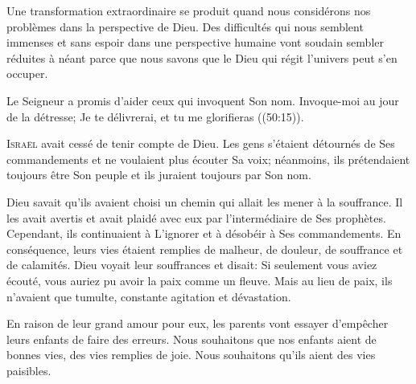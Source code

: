 Une transformation extraordinaire se produit quand nous considérons
 nos problèmes dans la perspective de Dieu.
 Des difficultés qui nous semblent immenses et sans espoir
 dans une perspective humaine vont soudain sembler réduites à néant
 \ocadr parce que nous savons que le Dieu qui régit l'univers
 peut s'en occuper. 

Le Seigneur a promis d'aider ceux qui invoquent Son nom.
 \Og Invoque-moi au jour de la détresse; Je te délivrerai,
 et tu me glorifieras \Fg{} ((50:15)).

\dvrule







\lettrine{I}{sraël} avait cessé de tenir compte de Dieu.
 Les gens s'étaient détournés de Ses commandements
 et ne voulaient plus écouter Sa voix; néanmoins, 
 ils prétendaient toujours être Son peuple
 et ils juraient toujours par Son nom. 

Dieu savait qu'ils avaient choisi un chemin
 qui allait les mener à la souffrance.
 Il les avait avertis et avait plaidé avec eux
 par l'intermédiaire de Ses prophètes.
 Cependant, ils continuaient à L'ignorer et à désobéir
 à Ses commandements. En conséquence,
 leurs vies étaient remplies de malheur, de douleur,
 de souffrance et de calamités.
 Dieu voyait leur souffrances et disait: 
 \Og Si seulement vous aviez écouté, vous auriez pu avoir la paix
 comme un fleuve. \Fg{} 
 Mais au lieu de paix, ils n'avaient que tumulte,
 constante agitation et dévastation. 


En raison de leur grand amour pour eux,
 les parents vont essayer d'empêcher leurs enfants de faire des erreurs.
 Nous souhaitons que nos enfants aient de bonnes vies,
 des vies remplies de joie.
 Nous souhaitons qu'ils 
 aient des vies paisibles. 

